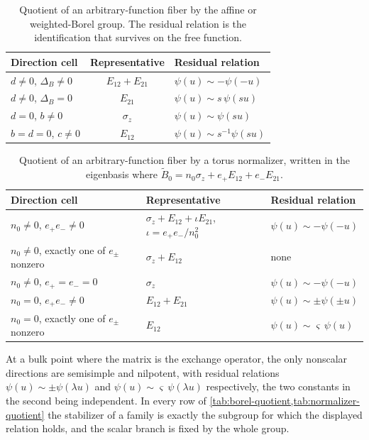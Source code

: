 \documentclass[11pt,reqno]{amsart}
\theoremstyle{plain}
\theoremstyle{definition}
\theoremstyle{remark}
\numberwithin{equation}{section}
\begin{document}
\begin{table}[t]
\centering\small
\caption{Quotient of an arbitrary-function fiber by the affine or weighted-Borel
group. The residual relation is the identification that survives on the free
function.}
\label{tab:borel-quotient}
\begin{tabularx}{\textwidth}{X c X}
\toprule
Direction cell & Representative & Residual relation \\
\midrule
$d\ne0$, $\Delta_B\ne0$ & $E_{12}+E_{21}$ & $\psi(u)\sim-\psi(-u)$ \\
$d\ne0$, $\Delta_B=0$ & $E_{21}$ & $\psi(u)\sim s\,\psi(su)$ \\
$d=0$, $b\ne0$ & $\sigma_z$ & $\psi(u)\sim \psi(su)$ \\
$b=d=0$, $c\ne0$ & $E_{12}$ & $\psi(u)\sim s^{-1}\psi(su)$ \\
\bottomrule
\end{tabularx}
\end{table}

\begin{table}[t]
\centering\small
\caption{Quotient of an arbitrary-function fiber by a torus normalizer, written
in the eigenbasis where
$\widetilde B_0=n_0\sigma_z+e_+E_{12}+e_-E_{21}$.}
\label{tab:normalizer-quotient}
\begin{tabularx}{\textwidth}{X X X}
\toprule
Direction cell & Representative & Residual relation \\
\midrule
$n_0\ne0$, $e_+e_-\ne0$ & $\sigma_z+E_{12}+\iota E_{21}$,
$\iota=e_+e_-/n_0^2$ & $\psi(u)\sim-\psi(-u)$ \\
$n_0\ne0$, exactly one of $e_\pm$ nonzero & $\sigma_z+E_{12}$ & none \\
$n_0\ne0$, $e_+=e_-=0$ & $\sigma_z$ & $\psi(u)\sim-\psi(-u)$ \\
$n_0=0$, $e_+e_-\ne0$ & $E_{12}+E_{21}$ & $\psi(u)\sim\pm\psi(\pm u)$ \\
$n_0=0$, exactly one of $e_\pm$ nonzero & $E_{12}$ & $\psi(u)\sim\varsigma\,\psi(u)$ \\
\bottomrule
\end{tabularx}
\end{table}

At a bulk point where the matrix is the exchange operator, the only nonscalar
directions are semisimple and nilpotent, with residual relations
$\psi(u)\sim\pm\psi(\lambda u)$ and $\psi(u)\sim\varsigma\,\psi(\lambda u)$
respectively, the two constants in the second being independent. In every row of
\cref{tab:borel-quotient,tab:normalizer-quotient} the stabilizer of a family is
exactly the subgroup for which the displayed relation holds, and the scalar
branch is fixed by the whole group.
\end{document}
